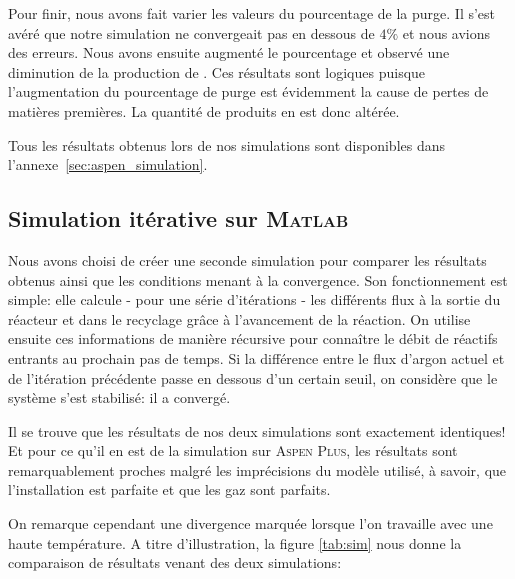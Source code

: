 Pour finir, nous avons fait varier les valeurs du pourcentage de la purge.
Il s'est avéré que notre simulation ne convergeait pas en dessous de $4\%$ 
et nous avions des erreurs.
Nous avons ensuite augmenté le pourcentage 
et observé une diminution de la production de . 
Ces résultats sont logiques puisque l'augmentation du pourcentage 
de purge est évidemment la cause de pertes de matières premières. 
La quantité de produits en est donc altérée.

Tous les résultats obtenus lors de nos simulations 
sont disponibles dans l'annexe~\ref{sec:aspen_simulation}.

\subsection{Simulation itérative sur \textsc{Matlab}}

Nous avons choisi de créer une seconde simulation
pour comparer les résultats obtenus ainsi que 
les conditions menant à la convergence.
Son fonctionnement est simple:
elle calcule - pour une série d'itérations - 
les différents flux à la sortie du réacteur 
et dans le recyclage grâce à l'avancement de
la réaction. On utilise ensuite ces informations 
de manière récursive pour connaître le débit de 
réactifs entrants au prochain pas de temps. Si 
la différence entre le flux d'argon actuel et 
de l'itération précédente passe en dessous d'un 
certain seuil, on considère que le système s'est 
stabilisé: il a convergé.

Il se trouve que les résultats de nos deux simulations
sont exactement identiques! Et pour ce qu'il en est
de la simulation sur \textsc{Aspen Plus}, les résultats sont
remarquablement proches malgré les imprécisions du modèle
utilisé, à savoir, que l'installation
est parfaite et que les gaz sont parfaits.

On remarque cependant une divergence marquée lorsque l'on travaille 
avec une haute température. A titre d'illustration, 
la figure \ref{tab:sim} nous donne la comparaison 
de résultats venant des deux simulations:


